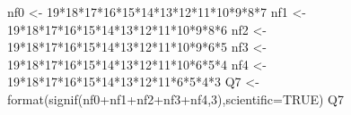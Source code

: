 \documentclass[
]{article}
\newenvironment{Shaded}{\begin{snugshade}}{\end{snugshade}}
\newcommand{\AttributeTok}[1]{\textcolor[rgb]{0.77,0.63,0.00}{#1}}
\newcommand{\ConstantTok}[1]{\textcolor[rgb]{0.00,0.00,0.00}{#1}}
\newcommand{\DecValTok}[1]{\textcolor[rgb]{0.00,0.00,0.81}{#1}}
\newcommand{\FunctionTok}[1]{\textcolor[rgb]{0.00,0.00,0.00}{#1}}
\newcommand{\NormalTok}[1]{#1}
\newcommand{\OtherTok}[1]{\textcolor[rgb]{0.56,0.35,0.01}{#1}}
\newcommand{\SpecialCharTok}[1]{\textcolor[rgb]{0.00,0.00,0.00}{#1}}
\begin{document}
\begin{Shaded}
\begin{Highlighting}[]
\NormalTok{nf0 }\OtherTok{\textless{}{-}} \DecValTok{19}\SpecialCharTok{*}\DecValTok{18}\SpecialCharTok{*}\DecValTok{17}\SpecialCharTok{*}\DecValTok{16}\SpecialCharTok{*}\DecValTok{15}\SpecialCharTok{*}\DecValTok{14}\SpecialCharTok{*}\DecValTok{13}\SpecialCharTok{*}\DecValTok{12}\SpecialCharTok{*}\DecValTok{11}\SpecialCharTok{*}\DecValTok{10}\SpecialCharTok{*}\DecValTok{9}\SpecialCharTok{*}\DecValTok{8}\SpecialCharTok{*}\DecValTok{7}
\NormalTok{nf1 }\OtherTok{\textless{}{-}} \DecValTok{19}\SpecialCharTok{*}\DecValTok{18}\SpecialCharTok{*}\DecValTok{17}\SpecialCharTok{*}\DecValTok{16}\SpecialCharTok{*}\DecValTok{15}\SpecialCharTok{*}\DecValTok{14}\SpecialCharTok{*}\DecValTok{13}\SpecialCharTok{*}\DecValTok{12}\SpecialCharTok{*}\DecValTok{11}\SpecialCharTok{*}\DecValTok{10}\SpecialCharTok{*}\DecValTok{9}\SpecialCharTok{*}\DecValTok{8}\SpecialCharTok{*}\DecValTok{6}
\NormalTok{nf2 }\OtherTok{\textless{}{-}} \DecValTok{19}\SpecialCharTok{*}\DecValTok{18}\SpecialCharTok{*}\DecValTok{17}\SpecialCharTok{*}\DecValTok{16}\SpecialCharTok{*}\DecValTok{15}\SpecialCharTok{*}\DecValTok{14}\SpecialCharTok{*}\DecValTok{13}\SpecialCharTok{*}\DecValTok{12}\SpecialCharTok{*}\DecValTok{11}\SpecialCharTok{*}\DecValTok{10}\SpecialCharTok{*}\DecValTok{9}\SpecialCharTok{*}\DecValTok{6}\SpecialCharTok{*}\DecValTok{5}
\NormalTok{nf3 }\OtherTok{\textless{}{-}} \DecValTok{19}\SpecialCharTok{*}\DecValTok{18}\SpecialCharTok{*}\DecValTok{17}\SpecialCharTok{*}\DecValTok{16}\SpecialCharTok{*}\DecValTok{15}\SpecialCharTok{*}\DecValTok{14}\SpecialCharTok{*}\DecValTok{13}\SpecialCharTok{*}\DecValTok{12}\SpecialCharTok{*}\DecValTok{11}\SpecialCharTok{*}\DecValTok{10}\SpecialCharTok{*}\DecValTok{6}\SpecialCharTok{*}\DecValTok{5}\SpecialCharTok{*}\DecValTok{4}
\NormalTok{nf4 }\OtherTok{\textless{}{-}} \DecValTok{19}\SpecialCharTok{*}\DecValTok{18}\SpecialCharTok{*}\DecValTok{17}\SpecialCharTok{*}\DecValTok{16}\SpecialCharTok{*}\DecValTok{15}\SpecialCharTok{*}\DecValTok{14}\SpecialCharTok{*}\DecValTok{13}\SpecialCharTok{*}\DecValTok{12}\SpecialCharTok{*}\DecValTok{11}\SpecialCharTok{*}\DecValTok{6}\SpecialCharTok{*}\DecValTok{5}\SpecialCharTok{*}\DecValTok{4}\SpecialCharTok{*}\DecValTok{3}
\NormalTok{Q7 }\OtherTok{\textless{}{-}} \FunctionTok{format}\NormalTok{(}\FunctionTok{signif}\NormalTok{(nf0}\SpecialCharTok{+}\NormalTok{nf1}\SpecialCharTok{+}\NormalTok{nf2}\SpecialCharTok{+}\NormalTok{nf3}\SpecialCharTok{+}\NormalTok{nf4,}\DecValTok{3}\NormalTok{),}\AttributeTok{scientific=}\ConstantTok{TRUE}\NormalTok{)}
\NormalTok{Q7}
\end{Highlighting}
\end{Shaded}
\end{document}
